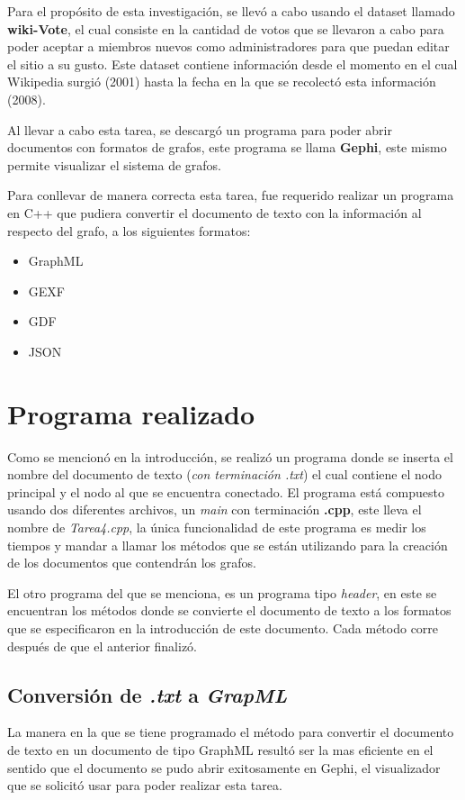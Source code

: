 \documentclass[acmsmall]{acmart}
\begin{document}
Para el propósito de esta investigación, se llevó a cabo usando el dataset llamado \textbf{wiki-Vote}, el cual consiste en la cantidad de votos que se llevaron a cabo para poder aceptar a miembros nuevos como administradores para que puedan editar el sitio a su gusto. Este dataset contiene información desde el momento en el cual Wikipedia surgió (2001) hasta la fecha en la que se recolectó esta información (2008).

Al llevar a cabo esta tarea, se descargó un programa para poder abrir documentos con formatos de grafos, este programa se llama \textbf{Gephi}, este mismo permite visualizar el sistema de grafos.

Para conllevar de manera correcta esta tarea, fue requerido realizar un programa en C++ que pudiera convertir el documento de texto con la información al respecto del grafo, a los siguientes formatos:
\begin{itemize}
\item GraphML
\item GEXF
\item GDF
\item JSON
\end{itemize}


\section{Programa realizado}
Como se mencionó en la introducción, se realizó un programa donde se inserta el nombre del documento de texto (\textit{con terminación .txt}) el cual contiene el nodo principal y el nodo al que se encuentra conectado. El programa está compuesto usando dos diferentes archivos, un \textit{main} con terminación \textbf{.cpp}, este lleva el nombre de \textit{Tarea4.cpp}, la única funcionalidad de este programa es medir los tiempos y mandar a llamar los métodos que se están utilizando para la creación de los documentos que contendrán los grafos.

El otro programa del que se menciona, es un programa tipo \textit{header}, en este se encuentran los métodos donde se convierte el documento de texto a los formatos que se especificaron en la introducción de este documento. Cada método corre después de que el anterior finalizó.


\subsection{Conversión de \textit{.txt} a \textit{GrapML}}
La manera en la que se tiene programado el método para convertir el documento de texto en un documento de tipo GraphML resultó ser la mas eficiente en el sentido que el documento se pudo abrir exitosamente en Gephi, el visualizador que se solicitó usar para poder realizar esta tarea.
\end{document}
